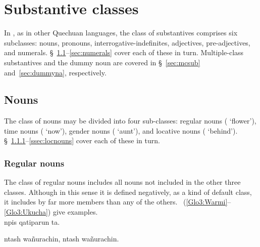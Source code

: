 \section{Substantive classes}
In \SYQ, as in other Quechuan languages, the class of substantives comprises six subclasses: nouns, pronouns, interrogative-indefinites, adjectives, pre-adjectives, and numerals. §~\ref{sec:nouns}--\ref{sec:numerals} cover each of these in turn. Multiple-class substantives and the dummy noun  are covered in §~\ref{sec:mcsub} and~\ref{sec:dummyna}, respectively.

\subsection{Nouns}\label{sec:nouns}
The class of nouns may be divided into four sub-classes: regular nouns ( ‘flower’), time nouns ( ‘now’), gender nouns ( ‘aunt’), and locative nouns ( ‘behind’). §~\ref{ssec:regnouns}--\ref{ssec:locnouns} cover each of these in turn.

\subsubsection{Regular nouns}\label{ssec:regnouns}
The class of regular nouns includes all nouns not included in the other three classes. Although in this sense it is defined negatively, as a kind of default class, it includes by far more members than any of the others. ~(\ref{Glo3:Warmi}--\ref{Glo3:Ukucha}) give examples.\\

%
{npis qatiparun ta.}%
{}%
{}{}%

%
{ntash wañurachin, ntash wañurachin.}%
{}%
{}{}%

